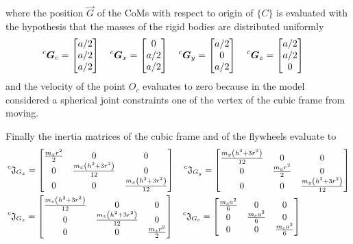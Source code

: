 where the position $\vec{G}$ of the CoMs with respect to origin of $\{C\}$ is evaluated with the hypothesis
that the masses of the rigid bodies are distributed uniformly
\[
\prescript{c}{}{\vec{G}}_{c} = 
\begin{bmatrix}
  a/2 \\
  a/2 \\
  a/2
\end{bmatrix} \quad
\prescript{c}{}{\vec{G}}_x = 
\begin{bmatrix}
  0 \\
  a/2 \\
  a/2
\end{bmatrix} \quad
\prescript{c}{}{\vec{G}}_y = 
\begin{bmatrix}
  a/2 \\
  0 \\
  a/2
\end{bmatrix} \quad
\prescript{c}{}{\vec{G}}_z = 
\begin{bmatrix}
  a/2 \\
  a/2 \\
  0
\end{bmatrix} \quad
\]
and the velocity of the point $O_{c}$ evaluates to zero because in
the model considered a spherical joint constraints one of the vertex of the cubic frame from moving.
\par
Finally the inertia matrices of the cubic frame and of the flywheels
evaluate to
\[
\begin{split}
  &\prescript{c}{}{\mathfrak{J}}_{G_{x}} = 
  \begin{bmatrix}
    \frac{m_x r^2}{2} & 0 & 0\\
    0 & \frac{m_x\left(h^2 + 3 r^2 \right)}{12}  & 0\\
    0 & 0 & \frac{m_x\left(h^2 + 3 r^2 \right)}{12}
  \end{bmatrix}
  \quad
  \prescript{c}{}{\mathfrak{J}}_{G_{y}} = 
  \begin{bmatrix}
    \frac{m_y\left(h^2 + 3 r^2 \right)}{12} & 0 & 0\\
    0 & \frac{m_y r^2}{2} & 0\\
    0 & 0 & \frac{m_y\left(h^2 + 3 r^2 \right)}{12}
  \end{bmatrix}\\
  &\prescript{c}{}{\mathfrak{J}}_{G_{z}} = 
  \begin{bmatrix}
    \frac{m_z\left(h^2 + 3 r^2 \right)}{12} & 0 & 0\\
    0 & \frac{m_z\left(h^2 + 3 r^2 \right)}{12} & 0\\
    0 & 0 & \frac{m_z r^2}{2}
  \end{bmatrix}
  \quad
  \prescript{c}{}{\mathfrak{J}}_{G_{c}} = 
  \begin{bmatrix}
    \frac{m_c a^2}{6} & 0 & 0\\
    0 & \frac{m_c a^2}{6} & 0\\
    0 & 0 & \frac{m_c a^2}{6}
  \end{bmatrix}
\end{split}
\]
